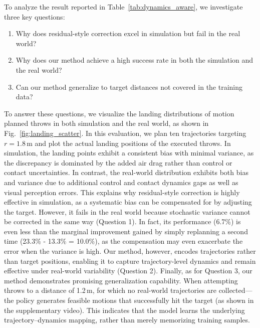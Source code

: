 \documentclass[letterpaper, 10 pt, conference]{ieeeconf}  %
\begin{document}
To analyze the result reported in Table~\ref{tab:dynamics_aware}, we investigate three key questions:
\begin{enumerate}
\item Why does residual-style correction excel in simulation but fail in the real world?
\item Why does our method achieve a high success rate in both the simulation and the real world?
\item Can our method generalize to target distances not covered in the training data?
\end{enumerate}

To answer these questions, we visualize the landing distributions of motion planned throws in both simulation and the real world, as shown in Fig.~\ref{fig:landing_scatter}. 
In this evaluation, we plan ten trajectories targeting $r=1.8$\,m and plot the actual landing positions of the executed throws.
In simulation, the landing points exhibit a consistent bias with minimal variance, as the discrepancy is dominated by the added air drag rather than control or contact uncertainties.
In contrast, the real-world distribution exhibits both bias and variance due to additional control and contact dynamics gaps as well as visual perception errors.
This explains why residual-style correction is highly effective in simulation, as a systematic bias can be compensated for by adjusting the target. However, it fails in the real world because stochastic variance cannot be corrected in the same way (Question 1).
In fact, its performance (6.7\%) is even less than the marginal improvement gained by simply replanning a second time (23.3\% - 13.3\% = 10.0\%), as the compensation may even exacerbate the error when the variance is high. 
Our method, however, encodes trajectories rather than target positions, enabling it to capture trajectory-level dynamics and remain effective under real-world variability (Question 2).
Finally, as for Question 3, our method demonstrates promising generalization capability. 
When attempting throws to a distance of 1.2\,m, for which no real-world trajectories are collected—the policy generates feasible motions that successfully hit the target (as shown in the supplementary video). 
This indicates that the model learns the underlying trajectory–dynamics mapping, rather than merely memorizing training samples.
\end{document}
